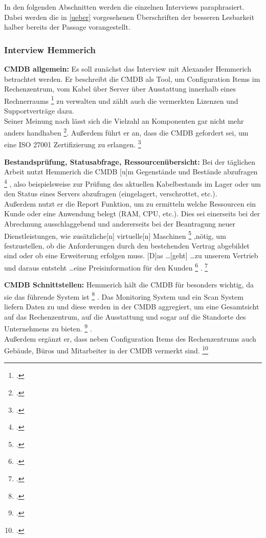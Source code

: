 In den folgenden Abschnitten werden die einzelnen Interviews paraphrasiert. Dabei werden die in \autoref{ueber} vorgesehenen Überschriften der besseren Lesbarkeit halber bereits der Passage vorangestellt.

\subsubsection{Interview Hemmerich}
\textbf{\acs{CMDB} allgemein: }Es soll zunächst das Interview mit Alexander Hemmerich betrachtet werden. Er beschreibt die \acs{CMDB} als Tool, um \glqq{}Configuration Items im Rechenzentrum, vom Kabel über Server über Ausstattung innerhalb eines Rechnerraums\grqq
\footcite[][o. \pno]{Hemm_2019}
zu verwalten und zählt auch die vermerkten Lizenzen und Supportverträge dazu.\\
Seiner Meinung nach lässt sich die Vielzahl an Komponenten \glqq{}gar nicht mehr anders handhaben\grqq
\footcite[][o. \pno]{Hemm_2019}.
Außerdem führt er an, dass die \acs{CMDB} gefordert sei, um eine ISO 27001 Zertifizierung zu erlangen.
\footcite[Vgl.][o. \pno]{Hemm_2019}

\textbf{Bestandsprüfung, Statusabfrage, Ressourcenübersicht: }Bei der täglichen Arbeit nutzt Hemmerich die \acs{CMDB} \glqq{}[u]m Gegenstände und Bestände abzufragen\grqq
\footcite[][o. \pno]{Hemm_2019}
, also beispielsweise zur Prüfung des aktuellen Kabelbestands im Lager oder um den Status eines Servers abzufragen (eingelagert, verschrottet, etc.).\\
Außerdem nutzt er die Report Funktion, um zu ermitteln welche Ressourcen ein Kunde oder eine Anwendung belegt (RAM, CPU, etc.). Dies sei einerseits bei der Abrechnung ausschlaggebend und andererseits bei der Beantragung neuer Dienstleistungen, wie \glqq{}zusätzliche[n] virtuelle[n] Maschinen\grqq
\footcite[][o. \pno]{Hemm_2019}
,nötig, um festzustellen, ob die Anforderungen durch den bestehenden Vertrag abgebildet sind oder ob eine Erweiterung erfolgen muss. \glqq{}[D]as \ldots [geht] \ldots zu unserem Vertrieb und daraus entsteht \ldots eine Preisinformation für den Kunden\grqq
\footcite[][o. \pno]{Hemm_2019}
.
\footcite[Vgl.][o. \pno]{Hemm_2019}

\textbf{\acs{CMDB} Schnittstellen: }Hemmerich hält die \acs{CMDB} für besonders wichtig, da sie \glqq{}das führende System ist\grqq
\footcite[][o. \pno]{Hemm_2019}
. Das Monitoring System und ein Scan System liefern Daten zu und diese werden in der CMDB \glqq{}aggregiert, um eine Gesamtsicht auf das Rechenzentrum, auf die Ausstattung und sogar auf die Standorte des Unternehmens zu bieten.\grqq
\footcite[][o. \pno]{Hemm_2019}
.\\
Außerdem ergänzt er, dass neben Configuration Items des Rechenzentrums auch Gebäude, Büros und Mitarbeiter in der \acs{CMDB} vermerkt sind.
\footcite[Vgl.][o. \pno]{Hemm_2019}

